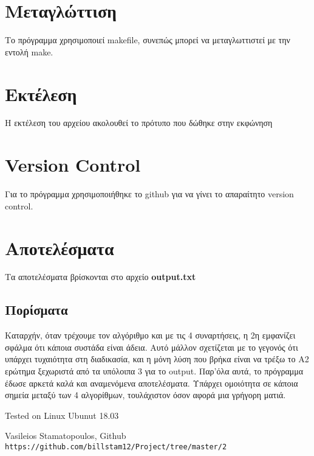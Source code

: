 \documentclass{article}
\begin{document}
\section{ \textgreek{Μεταγλώττιση}}
\textgreek{Το πρόγραμμα χρησιμοποιεί }makefile, \textgreek{συνεπώς μπορεί να μεταγλωττιστεί με την εντολή }make.
\section{\textgreek{Εκτέλεση}}
\textgreek{Η εκτέλεση του αρχείου ακολουθεί το πρότυπο που δώθηκε στην εκφώνηση}
\section{Version Control}
\textgreek{Για το πρόγραμμα χρησιμοποιήθηκε το} github \textgreek{για να γίνει το απαραίτητο }version control.\cite{mygit}

\section{\textgreek{Αποτελέσματα}}
\textgreek{Τα αποτελέσματα βρίσκονται στο αρχείο} \textbf{output.txt} 



\subsection{\textgreek{Πορίσματα}}
\textgreek{Καταρχήν, όταν τρέχουμε τον αλγόριθμο και με τις 4 συναρτήσεις, η 2η εμφανίζει σφάλμα ότι κάποια συστάδα είναι άδεια. Αυτό μάλλον σχετίζεται με το γεγονός ότι υπάρχει τυχαιότητα στη διαδικασία, και η μόνη λύση που βρήκα είναι να τρέξω το Α2 ερώτημα ξεχωριστά από τα υπόλοιπα 3 για το} output.
\textgreek{Παρ'όλα αυτά, το πρόγραμμα έδωσε αρκετά καλά και αναμενόμενα αποτελέσματα. Υπάρχει ομοιότητα σε κάποια σημεία μεταξύ των 4 αλγορίθμων, τουλάχιστον όσον αφορά μια γρήγορη ματιά.}


Tested on Linux Ubunut 18.03

\begin{thebibliography}{3}
Vasileios Stamatopoulos, Github
\\\texttt{https://github.com/billstam12/Project/tree/master/2}
\end{thebibliography}
 
\end{document}
